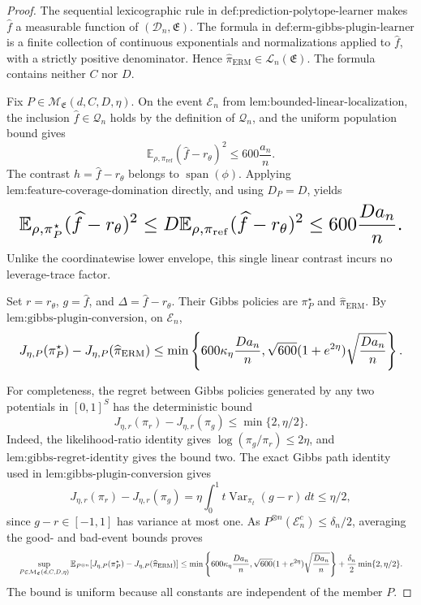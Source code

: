 \documentclass{article}
\begin{document}
\begin{proof}
The sequential lexicographic rule in \(\text{def:prediction-polytope-learner}\) makes \(\widehat f\) a measurable function of \((\mathcal D_n,\mathfrak E)\). The formula in \(\text{def:erm-gibbs-plugin-learner}\) is a finite collection of continuous exponentials and normalizations applied to \(\widehat f\), with a strictly positive denominator. Hence \(\widehat\pi_{\mathrm{ERM}}\in\mathcal L_n(\mathfrak E)\). The formula contains neither \(C\) nor \(D\).

Fix \(P\in\mathcal M_{\mathfrak E}(d,C,D,\eta)\). On the event \(\mathcal E_n\) from \(\text{lem:bounded-linear-localization}\), the inclusion \(\widehat f\in\mathcal Q_n\) holds by the definition of \(\mathcal Q_n\), and the uniform population bound gives
\[
\mathbb E_{\rho,\pi_{\mathrm{ref}}}(\widehat f-r_\theta)^2
\le600\frac{a_n}{n}.
\]
The contrast \(h=\widehat f-r_\theta\) belongs to \(\operatorname{span}(\phi)\). Applying \(\text{lem:feature-coverage-domination}\) directly, and using \(D_P=D\), yields
\[
\makebox[\linewidth][c]{\resizebox{0.98\linewidth}{!}{\(\displaystyle \mathbb E_{\rho,\pi_P^\star}(\widehat f-r_\theta)^2
\le D\mathbb E_{\rho,\pi_{\mathrm{ref}}}(\widehat f-r_\theta)^2
\le600\frac{Da_n}{n}.\)}}
\]
Unlike the coordinatewise lower envelope, this single linear contrast incurs no leverage-trace factor.

Set \(r=r_\theta\), \(g=\widehat f\), and \(\Delta=\widehat f-r_\theta\). Their Gibbs policies are \(\pi_P^\star\) and \(\widehat\pi_{\mathrm{ERM}}\). By \(\text{lem:gibbs-plugin-conversion}\), on \(\mathcal E_n\),
\[
\makebox[\linewidth][c]{\resizebox{0.98\linewidth}{!}{\(\displaystyle J_{\eta,P}(\pi_P^\star)-J_{\eta,P}(\widehat\pi_{\mathrm{ERM}})
\le
\min\left\{
600\kappa_\eta\frac{Da_n}{n},
\sqrt{600}(1+e^{2\eta})\sqrt{\frac{Da_n}{n}}
\right\}.\)}}
\]

For completeness, the regret between Gibbs policies generated by any two potentials in \([0,1]^S\) has the deterministic bound
\[
J_{\eta,r}(\pi_r)-J_{\eta,r}(\pi_g)\le\min\{2,\eta/2\}.
\]
Indeed, the likelihood-ratio identity gives \(\log(\pi_g/\pi_r)\le2\eta\), and \(\text{lem:gibbs-regret-identity}\) gives the bound two. The exact Gibbs path identity used in \(\text{lem:gibbs-plugin-conversion}\) gives
\[
J_{\eta,r}(\pi_r)-J_{\eta,r}(\pi_g)
=\eta\int_0^1t\operatorname{Var}_{\pi_t}(g-r)\,dt
\le\eta/2,
\]
since \(g-r\in[-1,1]\) has variance at most one. As \(P^{\otimes n}(\mathcal E_n^c)\le\delta_n/2\), averaging the good- and bad-event bounds proves
\[
\makebox[\linewidth][c]{\resizebox{0.98\linewidth}{!}{\(\displaystyle \sup_{P\in\mathcal M_{\mathfrak E}(d,C,D,\eta)}
\mathbb E_{P^{\otimes n}}[J_{\eta,P}(\pi_P^\star)-J_{\eta,P}(\widehat\pi_{\mathrm{ERM}})]
\le
\min\left\{
600\kappa_\eta\frac{Da_n}{n},
\sqrt{600}(1+e^{2\eta})\sqrt{\frac{Da_n}{n}}
\right\}
+\frac{\delta_n}{2}\min\{2,\eta/2\}.\)}}
\]
The bound is uniform because all constants are independent of the member \(P\).


\end{proof}
\end{document}
